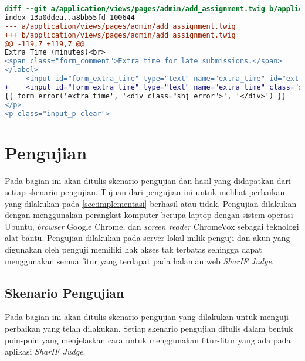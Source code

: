 \begin{lstlisting}[language=diff, caption=Perubahan untuk mematuhi kriteria 4.1.1, label=lst_4.1.1, basicstyle=\ttfamily, frame=single,
columns=fullflexible, keepspaces=true, breaklines=true]
diff --git a/application/views/pages/admin/add_assignment.twig b/application/views/pages/admin/add_assignment.twig
index 13a0ddea..a8bb55fd 100644
--- a/application/views/pages/admin/add_assignment.twig
+++ b/application/views/pages/admin/add_assignment.twig
@@ -119,7 +119,7 @@
Extra Time (minutes)<br>
<span class="form_comment">Extra time for late submissions.</span>
</label>
-    <input id="form_extra_time" type="text" name="extra_time" id="extra_time" class="sharif_input medium" value="{{ edit ? edit_assignment.extra_time|extra_time_formatter : set_value('extra_time') }}" />
+    <input id="form_extra_time" type="text" name="extra_time" class="sharif_input medium" value="{{ edit ? edit_assignment.extra_time|extra_time_formatter : set_value('extra_time') }}" />
{{ form_error('extra_time', '<div class="shj_error">', '</div>') }}
</p>
<p class="input_p clear">
\end{lstlisting}

\section{Pengujian}
\label{sec:pengujian}
Pada bagian ini akan ditulis skenario pengujian dan hasil yang didapatkan dari setiap skenario pengujian. Tujuan dari pengujian ini untuk melihat perbaikan yang dilakukan pada \ref{sec:implementasi} berhasil atau tidak. Pengujian dilakukan dengan menggunakan perangkat komputer berupa laptop dengan sistem operasi Ubuntu, \textit{browser} Google Chrome, dan \textit{screen reader} ChromeVox sebagai teknologi alat bantu. Pengujian dilakukan pada server lokal milik penguji dan akun yang digunakan oleh penguji memiliki hak akses tak terbatas sehingga dapat menggunakan semua fitur yang terdapat pada halaman web \textit{SharIF Judge}.

\subsection{Skenario Pengujian}
\label{subsec:skenario_pengujian}
Pada bagian ini akan ditulis skenario pengujian yang dilakukan untuk menguji perbaikan yang telah dilakukan. Setiap skenario pengujian ditulis dalam bentuk poin-poin yang menjelaskan cara untuk menggunakan fitur-fitur yang ada pada aplikasi \textit{SharIF Judge}.

